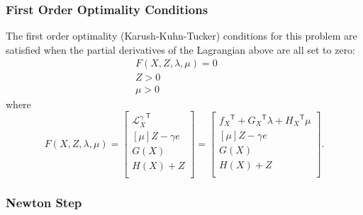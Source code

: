 \documentclass[12pt]{article}
\newcommand{\trans}[1]{{#1}^{\ensuremath{\mathsf{T}}}}  %
\newcommand{\diag}[1]{\left[{#1}\right]}                %
\numberwithin{equation}{section}
\numberwithin{table}{section}
\numberwithin{figure}{section}
\begin{document}
\subsubsection{First Order Optimality Conditions}

The first order optimality (Karush-Kuhn-Tucker) conditions for this problem are satisfied when the partial derivatives of the Lagrangian above are all set to zero:
\begin{eqnarray}
F(X, Z, \lambda, \mu) = 0 && \\
Z > 0 && \\
\mu > 0 &&
\end{eqnarray}
where
\begin{equation}
F(X, Z, \lambda, \mu) = \left[\begin{array}{c}
\trans{\mathcal{L}^\gamma_X} \\
\diag{\mu} Z - \gamma e \\
G(X) \\
H(X) + Z \\
\end{array}\right] = \left[\begin{array}{c}
\trans{f_X} + \trans{G_X} \lambda + \trans{H_X} \mu \\
\diag{\mu} Z - \gamma e \\
G(X) \\
H(X) + Z \\
\end{array}\right].
\end{equation}

\subsubsection{Newton Step}
\end{document}
